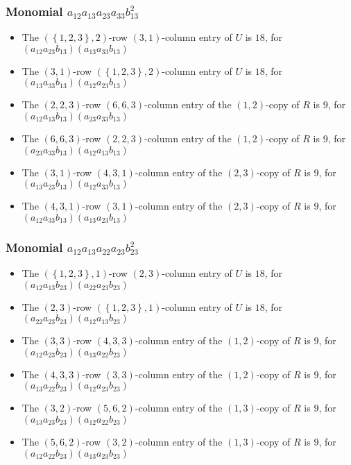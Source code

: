 \documentclass{article}
\begin{document}
\subsubsection{Monomial $ a_{12} a_{13} a_{23} a_{33} b_{13}^{2} $}

\begin{itemize}
\item The $ \left(\left\{1, 2, 3\right\}, 2\right) $-row $ \left(3, 1\right) $-column entry of $U$ is $ 18 $, for $( a_{12} a_{23} b_{13} )( a_{13} a_{33} b_{13} )$ 
\item The $ \left(3, 1\right) $-row $ \left(\left\{1, 2, 3\right\}, 2\right) $-column entry of $U$ is $ 18 $, for $( a_{13} a_{33} b_{13} )( a_{12} a_{23} b_{13} )$ 
\item The $(2, 2, 3)$-row $(6, 6, 3)$-column entry of the $ \left(1, 2\right) $-copy of $R$ is $ 9 $, for $( a_{12} a_{13} b_{13} )( a_{23} a_{33} b_{13} )$ 
\item The $(6, 6, 3)$-row $(2, 2, 3)$-column entry of the $ \left(1, 2\right) $-copy of $R$ is $ 9 $, for $( a_{23} a_{33} b_{13} )( a_{12} a_{13} b_{13} )$ 
\item The $(3, 1)$-row $(4, 3, 1)$-column entry of the $ \left(2, 3\right) $-copy of $R$ is $ 9 $, for $( a_{13} a_{23} b_{13} )( a_{12} a_{33} b_{13} )$ 
\item The $(4, 3, 1)$-row $(3, 1)$-column entry of the $ \left(2, 3\right) $-copy of $R$ is $ 9 $, for $( a_{12} a_{33} b_{13} )( a_{13} a_{23} b_{13} )$ 
\end{itemize}
\subsubsection{Monomial $ a_{12} a_{13} a_{22} a_{23} b_{23}^{2} $}

\begin{itemize}
\item The $ \left(\left\{1, 2, 3\right\}, 1\right) $-row $ \left(2, 3\right) $-column entry of $U$ is $ 18 $, for $( a_{12} a_{13} b_{23} )( a_{22} a_{23} b_{23} )$ 
\item The $ \left(2, 3\right) $-row $ \left(\left\{1, 2, 3\right\}, 1\right) $-column entry of $U$ is $ 18 $, for $( a_{22} a_{23} b_{23} )( a_{12} a_{13} b_{23} )$ 
\item The $(3, 3)$-row $(4, 3, 3)$-column entry of the $ \left(1, 2\right) $-copy of $R$ is $ 9 $, for $( a_{12} a_{23} b_{23} )( a_{13} a_{22} b_{23} )$ 
\item The $(4, 3, 3)$-row $(3, 3)$-column entry of the $ \left(1, 2\right) $-copy of $R$ is $ 9 $, for $( a_{13} a_{22} b_{23} )( a_{12} a_{23} b_{23} )$ 
\item The $(3, 2)$-row $(5, 6, 2)$-column entry of the $ \left(1, 3\right) $-copy of $R$ is $ 9 $, for $( a_{13} a_{23} b_{23} )( a_{12} a_{22} b_{23} )$ 
\item The $(5, 6, 2)$-row $(3, 2)$-column entry of the $ \left(1, 3\right) $-copy of $R$ is $ 9 $, for $( a_{12} a_{22} b_{23} )( a_{13} a_{23} b_{23} )$ 
\end{itemize}
\end{document}
